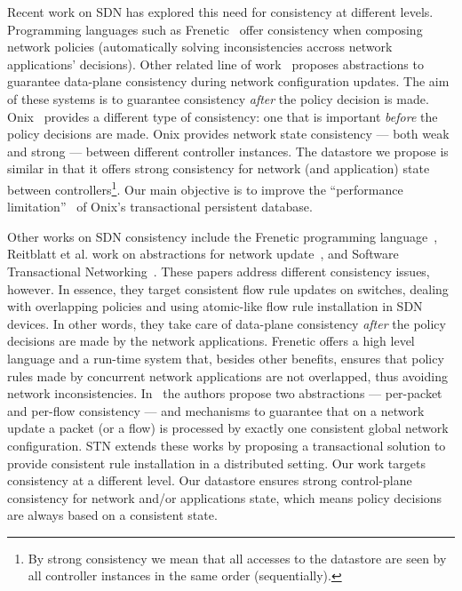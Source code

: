 Recent work on SDN has explored this need for consistency at different
levels. Programming languages such as Frenetic~\cite{Foster2011} offer
consistency when composing network policies (automatically solving
inconsistencies accross network applications' decisions). Other
related line of work~\cite{reitblatt2012abstractions} proposes
abstractions to guarantee data-plane consistency during network
configuration updates. The aim of these systems is to guarantee
consistency \textit{after} the policy decision is
made. Onix~\cite{Koponen:2010:ODC:1924943.1924968} provides a
different type of consistency: one that is important \emph{before} the
policy decisions are made. Onix provides network state consistency ---
both weak and strong --- between different controller instances. The
datastore we propose is similar in that it offers strong consistency
for network (and application) state between controllers\footnote{By
  strong consistency we mean that all accesses to the datastore are
  seen by all controller instances in the same order
  (sequentially).}. Our main objective is to improve the ``performance
limitation''~\cite{Koponen:2010:ODC:1924943.1924968} of Onix's
transactional persistent database. 


Other works on SDN consistency include the Frenetic programming language~\cite{Foster2011}, Reitblatt et al. work on abstractions for network update~\cite{reitblatt2012abstractions}, and Software Transactional Networking~\cite{Canini:2013:HotSDN:STN}. 
These papers address different consistency issues, however. 
In essence, they target consistent flow rule updates on switches, dealing with overlapping policies and using atomic-like flow rule installation in SDN devices.
In other words, they take care of data-plane consistency \emph{after} the policy decisions are made by the network applications. 
Frenetic offers a high level language and a run-time system that, besides other benefits, ensures that policy rules made by concurrent network applications are not overlapped, thus avoiding network inconsistencies.
In~\cite{reitblatt2012abstractions} the authors propose two abstractions --- per-packet and per-flow consistency --- and mechanisms to guarantee that on a network update a packet (or a flow) is processed by exactly one consistent global network configuration. 
STN extends these works by proposing a transactional solution to provide consistent rule installation in a distributed setting. 
Our work targets consistency at a different level.
Our datastore ensures strong control-plane consistency for network and/or applications state, which means policy decisions are always based on a consistent state.